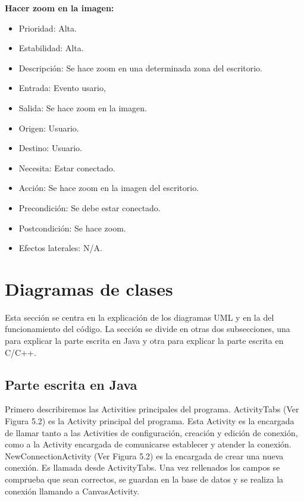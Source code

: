 \textbf{Hacer zoom en la imagen:}
\begin{itemize}
\item Prioridad: Alta.
\item Estabilidad: Alta.
\item Descripción: Se hace zoom en una determinada zona del escritorio.
\item Entrada: Evento usario,
\item Salida: Se hace zoom en la imagen.
\item Origen: Usuario.
\item Destino: Usuario.
\item Necesita: Estar conectado.
\item Acción: Se hace zoom en la imagen del escritorio.
\item Precondición: Se debe estar conectado.
\item Postcondición: Se hace zoom.
\item Efectos laterales: N/A.\\

\end{itemize}
\newpage
\section {Diagramas de clases}

Esta sección se centra en la explicación de los diagramas UML y en la del funcionamiento del código. La sección se divide en otras dos subsecciones, una para explicar la parte escrita en Java y otra para explicar la parte escrita en C/C++.

\subsection{Parte escrita en Java}

Primero describiremos las Activities principales del programa. ActivityTabs (Ver Figura 5.2) es la Activity principal del programa. Esta Activity es la encargada de llamar tanto a las Activities de configuración, creación y edición de conexión, como a la Activity encargada de comunicarse establecer y atender la conexión.\\

NewConnectionActivity (Ver Figura 5.2) es la encargada de crear una nueva conexión. Es llamada desde ActivityTabs. Una vez rellenados los campos se comprueba que sean correctos, se guardan en la base de datos y se realiza la conexión llamando a CanvasActivity.\\

